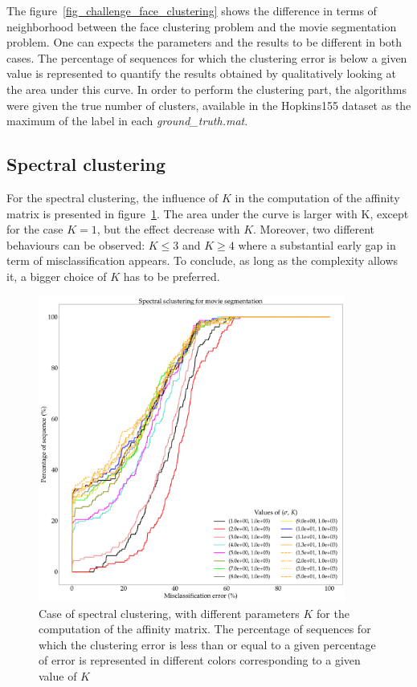 \documentclass[12pt,a4paper,onecolumn]{article}
\begin{document}
The figure~\ref{fig_challenge_face_clustering} shows the difference in terms of neighborhood between the face clustering problem and the movie segmentation problem. One can expects the parameters and the results to be different in both cases. The percentage of sequences for which the clustering error is below a given value is represented to quantify the results obtained by qualitatively looking at the area under this curve. In order to perform the clustering part, the algorithms were given the true number of clusters, available in the Hopkins155 dataset as the maximum of the label in each \textit{ground\_truth.mat}.

\subsection{Spectral clustering}

For the spectral clustering, the influence of \(K\) in the computation of the affinity matrix is presented in figure~\ref{fig_motion_sc_res_k}. The area under the curve is larger with K, except for the case \(K=1\), but the effect decrease with \(K\). Moreover, two different behaviours can be observed: \(K \leq 3\) and \(K \geq 4\) where a substantial early gap in term of misclassification appears. To conclude, as long as the complexity allows it, a bigger choice of \(K\) has to be preferred.

\begin{figure}[H]
	\centering
	\includegraphics[width = 0.9\textwidth]{SC_1e3}
	\caption{Case of spectral clustering, with different parameters \(K\) for the computation of the affinity matrix. The percentage of sequences for which the clustering error is less than or equal to a given percentage of error is represented in different colors corresponding to a given value of \(K\)}
	\label{fig_motion_sc_res_k}
\end{figure}
\end{document}
